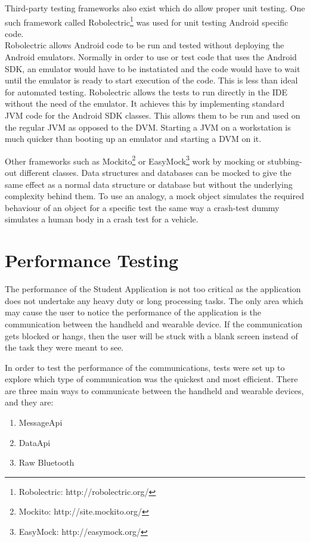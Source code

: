 Third-party testing frameworks also exist which do allow proper unit testing.
One such framework called
Robolectric\footnote{Robolectric: http://robolectric.org/} was
used for unit testing Android specific code.\\
Robolectric allows Android code to be run and tested without deploying the
Android emulators. Normally in order to use or test code that uses the Android
SDK, an emulator would have to be instatiated and the code would have to wait
until the emulator is ready to start execution of the code. This is less than
ideal for automated testing. Robolectric allows the tests to run directly in the
IDE without the need of the emulator. It achieves this by implementing standard
JVM code for the Android SDK classes. This allows them to be run and used on the
regular JVM as opposed to the DVM. Starting a JVM on a workstation is much
quicker than booting up an emulator and starting a DVM on it.

Other frameworks such as
Mockito\footnote{Mockito: http://site.mockito.org/} or 
EasyMock\footnote{EasyMock: http://easymock.org/} work by
mocking or stubbing-out different classes. Data structures and databases can
be mocked to give the same effect as a normal data structure or database but
without the underlying complexity behind them. To use an analogy, a mock object
simulates the required behaviour of an object for a specific test the same way a
crash-test dummy simulates a human body in a crash test for a vehicle.

\section{Performance Testing}
The performance of the Student Application is not too critical as the
application does not undertake any heavy duty or long processing tasks. The only
area which may cause the user to notice the performance of the application is
the communication between the handheld and wearable device. If the communication
gets blocked or hangs, then the user will be stuck with a blank screen instead
of the task they were meant to see.

In order to test the performance of the communications, tests were set up to 
explore which type of communication was the quickest and most efficient. There
are three main ways to communicate between the handheld and wearable devices,
and they are:
\begin{enumerate}
\item MessageApi
\item DataApi
\item Raw Bluetooth
\end{enumerate}


